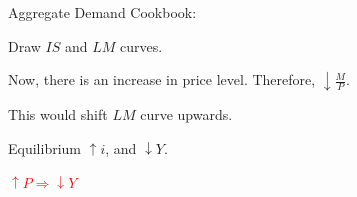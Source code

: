 \documentclass[shownotes,11pt, aspectratio=169]{beamer}
\newenvironment{wideitemize}{\itemize\addtolength{\itemsep}{10pt}}{\enditemize}
\begin{document}
\begin{frame}{Aggregate Demand}
Cookbook:

\begin{wideitemize}
\item Draw $IS$ and $LM$ curves.
\item Now, there is an increase in price level. Therefore, $\downarrow \frac{M}{P}$.
\item This would shift \pause $LM$ curve upwards. 
\item Equilibrium $ \uparrow i$, and $\downarrow Y$.
\item \textcolor{red}{$\uparrow P \Rightarrow \downarrow Y$}
\end{wideitemize}
\end{frame}

\begin{frame}
\end{frame}
\end{document}
